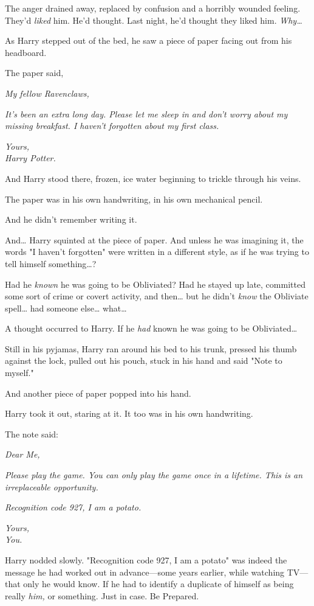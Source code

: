 The anger drained away, replaced by confusion and a horribly wounded feeling. 
They'd \emph{liked} him. He'd thought. Last night, he'd thought they liked him. 
\emph{Why{\ldots}}

As Harry stepped out of the bed, he saw a piece of paper facing out from his 
headboard.

The paper said,

\emph{My fellow Ravenclaws,}

\emph{It's been an extra long day. Please let me sleep in and don't worry about 
my missing breakfast. I haven't forgotten about my first class.}

\emph{Yours,\\
Harry Potter.}

And Harry stood there, frozen, ice water beginning to trickle through his veins.

The paper was in his own handwriting, in his own mechanical pencil.

And he didn't remember writing it.

And{\ldots} Harry squinted at the piece of paper. And unless he was imagining 
it, the words "I haven't forgotten" were written in a different style, as if he 
was trying to tell himself something{\ldots}?

Had he \emph{known} he was going to be Obliviated? Had he stayed up late, 
committed some sort of crime or covert activity, and then{\ldots} but he didn't 
\emph{know} the Obliviate spell{\ldots} had someone else{\ldots} what{\ldots}

A thought occurred to Harry. If he \emph{had} known he was going to be 
Obliviated{\ldots}

Still in his pyjamas, Harry ran around his bed to his trunk, pressed his thumb 
against the lock, pulled out his pouch, stuck in his hand and said "Note to 
myself."

And another piece of paper popped into his hand.

Harry took it out, staring at it. It too was in his own handwriting.

The note said:

\emph{Dear Me,}

\emph{Please play the game. You can only play the game once in a lifetime. This 
is an irreplaceable opportunity.}

\emph{Recognition code 927, I am a potato.}

\emph{Yours,\\
You.}

Harry nodded slowly. "Recognition code 927, I am a potato" was indeed the 
message he had worked out in advance---some years earlier, while watching 
TV---that only he would know. If he had to identify a duplicate of himself as 
being really \emph{him,} or something. Just in case. Be Prepared.

